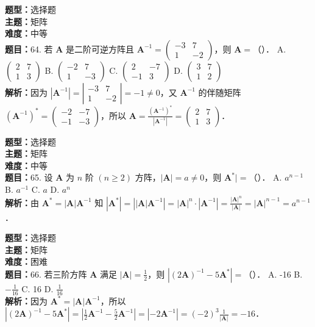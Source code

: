 \documentclass{ctexart}
\newenvironment{question}[5]{%
	\noindent\textbf{题型：}#1\\
	\textbf{主题：}#2\\
	\textbf{难度：}#3\\
	\textbf{题目：}#4\\
	\textbf{解析：}#5\\
	\vspace{1em}
}{}
\begin{document}
	\begin{question}
		{选择题}
		{矩阵}
		{中等}
		{64. 若 \(\mathbf{A}\) 是二阶可逆方阵且 \(\mathbf{A}^{-1}=\left(\begin{array}{cc}-3 & 7 \\ 1 & -2\end{array}\right)\)，则 \(\mathbf{A}=\)（）．
			A. \(\left(\begin{array}{ll}2 & 7 \\ 1 & 3\end{array}\right)\)
			B. \(\left(\begin{array}{cc}-2 & 7 \\ 1 & -3\end{array}\right)\)
			C. \(\left(\begin{array}{cc}2 & -7 \\ -1 & 3\end{array}\right)\)
			D. \(\left(\begin{array}{ll}3 & 7 \\ 1 & 2\end{array}\right)\)}
		{因为 \(\left|\mathbf{A}^{-1}\right|=\left|\begin{array}{cc}-3 & 7 \\ 1 & -2\end{array}\right|=-1 \neq 0\)，又 \(\mathbf{A}^{-1}\) 的伴随矩阵 \(\left(\mathbf{A}^{-1}\right)^*=\left(\begin{array}{cc}-2 & -7 \\ -1 & -3\end{array}\right)\)，所以 \(\mathbf{A}=\frac{\left(\mathbf{A}^{-1}\right)^*}{\left|\mathbf{A}^{-1}\right|}=\left(\begin{array}{ll}2 & 7 \\ 1 & 3\end{array}\right)\)．}
	\end{question}
	
	\begin{question}
		{选择题}
		{矩阵}
		{中等}
		{65. 设 \(\mathbf{A}\) 为 \(n\) 阶 \((n \geq 2)\) 方阵，\(|\mathbf{A}|=a \neq 0\)，则 \(\mathbf{A}^* \mid=\)（）．
			A. \(a^{n-1}\)
			B. \(a^{-1}\)
			C. \(a\)
			D. \(a^n\)}
		{由 \(\mathbf{A}^*=|\mathbf{A}| \mathbf{A}^{-1}\) 知 \(\left|\mathbf{A}^*\right|=\left||\mathbf{A}| \mathbf{A}^{-1}\right|=|\mathbf{A}|^n \cdot\left|\mathbf{A}^{-1}\right|=\frac{|\mathbf{A}|^n}{|\mathbf{A}|}=|\mathbf{A}|^{n-1}=a^{n-1}\)．}
	\end{question}
	
	\begin{question}
		{选择题}
		{矩阵}
		{困难}
		{66. 若三阶方阵 \(\mathbf{A}\) 满足 \(|\mathbf{A}|=\frac{1}{2}\)，则 \(\left|(2 \mathbf{A})^{-1}-5 \mathbf{A}^*\right|=\)（）．
			A. -16
			B. \(-\frac{1}{16}\)
			C. 16
			D. \(\frac{1}{16}\)}
		{因为 \(\mathbf{A}^*=|\mathbf{A}| \mathbf{A}^{-1}\)，所以 \(\left|(2 \mathbf{A})^{-1}-5 \mathbf{A}^*\right|=\left|\frac{1}{2} \mathbf{A}^{-1}-\frac{5}{2} \mathbf{A}^{-1}\right|=\left|-2 \mathbf{A}^{-1}\right|=(-2)^3 \frac{1}{|\mathbf{A}|}=-16\)．}
	\end{question}
	
\end{document}
